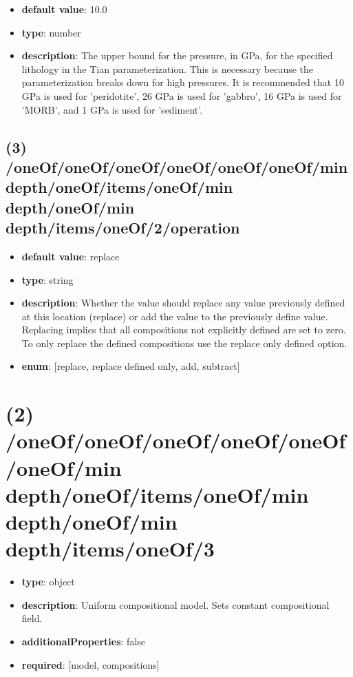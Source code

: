 \begin{itemize}[leftmargin=3em]\item {\bf default value}: 10.0
\item {\bf type}: number
\item {\bf description}: The upper bound for the pressure, in GPa, for the specified lithology in the Tian parameterization. This is necessary because the parameterization breaks down for high pressures. It is recommended that 10 GPa is used for 'peridotite', 26 GPa is used for 'gabbro', 16 GPa is used for 'MORB', and 1 GPa is used for 'sediment'.
\end{itemize}\subsection{(3) /oneOf/oneOf/oneOf/oneOf/oneOf/oneOf/min depth/oneOf/items/oneOf/min depth/oneOf/min depth/items/oneOf/2/operation}
\begin{itemize}[leftmargin=3em]\item {\bf default value}: replace
\item {\bf type}: string
\item {\bf description}: Whether the value should replace any value previously defined at this location (replace) or add the value to the previously define value. Replacing implies that all compositions not explicitly defined are set to zero. To only replace the defined compositions use the replace only defined option.
\item {\bf enum}: [replace, replace defined only, add, subtract]\end{itemize}\section{(2) /oneOf/oneOf/oneOf/oneOf/oneOf/oneOf/min depth/oneOf/items/oneOf/min depth/oneOf/min depth/items/oneOf/3}
\begin{itemize}[leftmargin=2em]\item {\bf type}: object
\item {\bf description}: Uniform compositional model. Sets constant compositional field.
\item {\bf additionalProperties}: false
\item {\bf required}: [model, compositions]\end{itemize}
